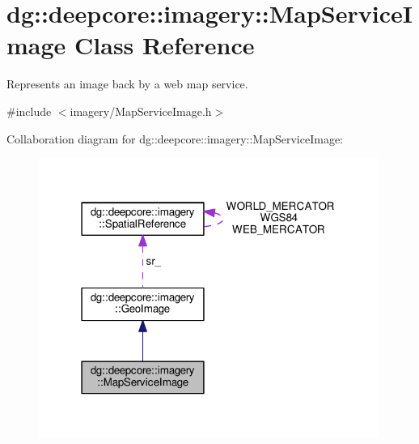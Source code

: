 \hypertarget{classdg_1_1deepcore_1_1imagery_1_1_map_service_image}{}\section{dg\+:\+:deepcore\+:\+:imagery\+:\+:Map\+Service\+Image Class Reference}
\label{classdg_1_1deepcore_1_1imagery_1_1_map_service_image}


Represents an image back by a web map service.  




{\ttfamily \#include $<$imagery/\+Map\+Service\+Image.\+h$>$}



Collaboration diagram for dg\+:\+:deepcore\+:\+:imagery\+:\+:Map\+Service\+Image\+:
\nopagebreak
\begin{figure}[H]
\begin{center}
\leavevmode
\includegraphics[width=315pt]{classdg_1_1deepcore_1_1imagery_1_1_map_service_image__coll__graph}
\end{center}
\end{figure}
